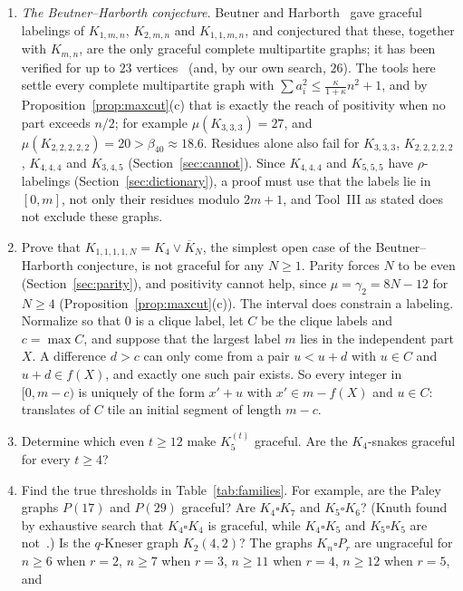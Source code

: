 \documentclass[11pt]{amsart}
\theoremstyle{tplain}
\theoremstyle{tdefinition}
\theoremstyle{tremark}
\begin{document}
\begin{enumerate}
\item \emph{The Beutner--Harborth conjecture.} Beutner and
  Harborth~\cite{beutner} gave graceful labelings of $K_{1,m,n}$, $K_{2,m,n}$
  and $K_{1,1,m,n}$, and conjectured that these, together with $K_{m,n}$, are
  the only graceful complete multipartite graphs; it has been verified for up
  to $23$ vertices~\cite{gallian} (and, by our own search, $26$). The tools
  here settle every complete multipartite graph with
  $\sum a_i^2\le\frac\kappa{1+\kappa}n^2+1$, and by
  Proposition~\ref{prop:maxcut}(c) that is exactly the reach of positivity when
  no part exceeds $n/2$; for example $\mu(K_{3,3,3})=27$, and
  $\mu(K_{2,2,2,2,2})=20>\beta_{40}\approx18.6$. Residues alone also fail for
  $K_{3,3,3}$, $K_{2,2,2,2,2}$, $K_{4,4,4}$ and $K_{3,4,5}$
  (Section~\ref{sec:cannot}). Since $K_{4,4,4}$ and $K_{5,5,5}$ have
  $\rho$-labelings (Section~\ref{sec:dictionary}), a proof must use that the labels lie in $[0,m]$, not only their residues
  modulo $2m+1$, and Tool~III as stated does not exclude these graphs.
\item Prove that $K_{1,1,1,1,N}=K_4\vee\overline K_N$, the simplest open case
  of the Beutner--Harborth conjecture, is not graceful for any $N\ge1$.
  Parity forces $N$ to be even (Section~\ref{sec:parity}), and positivity
  cannot help, since $\mu=\gamma_2=8N-12$ for $N\ge4$
  (Proposition~\ref{prop:maxcut}(c)). The interval does constrain a labeling. Normalize so that $0$ is a
  clique label, let $C$ be the clique labels and $c=\max C$, and suppose that
  the largest label $m$ lies in the independent part $X$. A difference
  $d>c$ can only come from a pair $u<u+d$ with $u\in C$ and $u+d\in f(X)$, and
  exactly one such pair exists. So every integer in $[0,m-c)$ is uniquely
  of the form $x'+u$ with $x'\in m-f(X)$ and $u\in C$: translates of $C$ tile
  an initial segment of length $m-c$.
\item Determine which even $t\ge12$ make $K_5^{(t)}$ graceful. Are the
  $K_4$-snakes graceful for every $t\ge4$?
\item Find the true thresholds in Table~\ref{tab:families}. For example, are the Paley graphs $P(17)$ and $P(29)$ graceful? Are $K_4\square K_7$ and
  $K_5\square K_6$? (Knuth found by exhaustive search that $K_4\square K_4$
  is graceful, while $K_4\square K_5$ and $K_5\square K_5$ are
  not~\cite[\S7.2.2.3, exercise~88]{knuth-pre}.) Is the $q$-Kneser graph
  $K_2(4,2)$? The graphs $K_n\square P_r$ are ungraceful for $n\ge6$ when
  $r=2$, $n\ge7$ when $r=3$, $n\ge11$ when $r=4$, $n\ge12$ when $r=5$, and

\end{enumerate}
\end{document}
